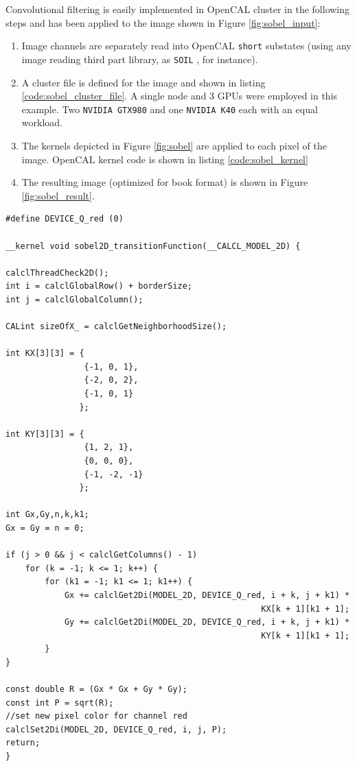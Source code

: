 Convolutional filtering is easily implemented in OpenCAL cluster in the following steps and has been applied to the image shown in Figure \ref{fig:sobel_input}:
\begin{enumerate}
    \item Image channels are separately read into OpenCAL \texttt{short} substates (using any image reading third part library, as \texttt{SOIL} \cite{SOIL}, for instance).
    \item A cluster file is defined for the image and shown in listing \ref{code:sobel_cluster_file}. A single node and 3 GPUs were employed in this example. Two \texttt{NVIDIA GTX980} and one \texttt{NVIDIA K40} each with an equal workload.
    \item The kernels depicted in Figure \ref{fig:sobel} are applied to each pixel of the image. OpenCAL kernel code is shown in listing \ref{code:sobel_kernel} 
    \item The resulting image (optimized for book format) is shown in Figure \ref{fig:sobel_result}.
\end{enumerate}

\begin{lstlisting}
#define DEVICE_Q_red (0)

__kernel void sobel2D_transitionFunction(__CALCL_MODEL_2D) {

calclThreadCheck2D();
int i = calclGlobalRow() + borderSize;
int j = calclGlobalColumn();

CALint sizeOfX_ = calclGetNeighborhoodSize();

int KX[3][3] = {
				{-1, 0, 1},
				{-2, 0, 2},
				{-1, 0, 1}
			   };

int KY[3][3] = {
				{1, 2, 1},
				{0, 0, 0},
				{-1, -2, -1}
			   };

int Gx,Gy,n,k,k1;
Gx = Gy = n = 0;

if (j > 0 && j < calclGetColumns() - 1)
	for (k = -1; k <= 1; k++) {
		for (k1 = -1; k1 <= 1; k1++) {
			Gx += calclGet2Di(MODEL_2D, DEVICE_Q_red, i + k, j + k1) *
													KX[k + 1][k1 + 1];
			Gy += calclGet2Di(MODEL_2D, DEVICE_Q_red, i + k, j + k1) *
													KY[k + 1][k1 + 1];
		}
}

const double R = (Gx * Gx + Gy * Gy);
const int P = sqrt(R);
//set new pixel color for channel red
calclSet2Di(MODEL_2D, DEVICE_Q_red, i, j, P);
return;
}

\end{lstlisting}


